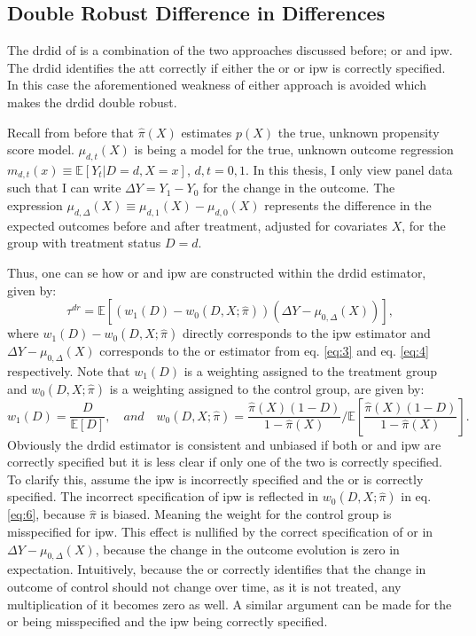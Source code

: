 \subsection{Double Robust Difference in Differences}

The \ac{drdid} of \citet{santannaDoublyRobustDifferenceindifferences2020} is a combination of the two approaches discussed before; \ac{or} and \ac{ipw}.
The \ac{drdid} identifies the \ac{att} correctly if either the \ac{or} or \ac{ipw} is correctly specified.
In this case the aforementioned weakness of either approach is avoided which makes the \ac{drdid} double robust.

Recall from before that $\hat{\pi}(X)$ estimates $p(X)$ the true, unknown propensity score model. $\mu_{d,t}(X)$ is being a model for the true, unknown outcome regression $m_{d,t}(x)\equiv \mathbb{E}[Y_t | D = d, X = x]$, $d, t = 0, 1$.
In this thesis, I only view panel data such that I can write $\Delta Y = Y_1 - Y_0$ for the change in the outcome.
The expression $\mu_{d,\Delta}(X) \equiv \mu_{d,1}(X) - \mu_{d,0}(X)$ represents the difference in the expected outcomes before and after treatment, adjusted for covariates $X$, for the group with treatment status $D=d$.

Thus, one can se how \ac{or} and \ac{ipw} are constructed within the \ac{drdid} estimator, given by:
\begin{equation}
\tau^{dr} = \mathbb{E} \left[ \left( w_1(D) - w_0(D, X; \hat{\pi}) \right) \left( \Delta Y - \mu_{0, \Delta}(X) \right) \right],
\label{eq:5}
\end{equation}
where $w_1(D) - w_0(D, X; \hat{\pi})$ directly corresponds to the \ac{ipw} estimator and $\Delta Y - \mu_{0, \Delta}(X)$ corresponds to the \ac{or} estimator from eq. \ref{eq:3} and eq. \ref{eq:4} respectively.
Note that $w_1(D)$ is a weighting assigned to the treatment group and $w_0(D, X; \hat{\pi})$ is a weighting assigned to the control group, are given by:
\begin{equation}
w_1(D) = \frac{D}{\mathbb{E}[D]}, \quad  \mathit{and} \quad
w_0(D, X; \hat{\pi}) = \frac{\hat{\pi}(X)(1-D)}{1 - \hat{\pi}(X)} \Bigg/ \mathbb{E} \left[ \frac{\hat{\pi}(X)(1-D)}{1 - \hat{\pi}(X)} \right].
\label{eq:6}
\end{equation}
Obviously the \ac{drdid} estimator is consistent and unbiased if both \ac{or} and \ac{ipw} are correctly specified but it is less clear if only one of the two is correctly specified.
To clarify this, assume the \ac{ipw} is incorrectly specified and the \ac{or} is correctly specified.
The incorrect specification of \ac{ipw} is reflected in $w_0(D, X; \hat{\pi})$ in eq. \ref{eq:6}, because $\hat{\pi}$ is biased.
Meaning the weight for the control group is misspecified for \ac{ipw}.
This effect is nullified by the correct specification of \ac{or} in $\Delta Y - \mu_{0, \Delta}(X)$, because the change in the outcome evolution is zero in expectation.
Intuitively, because the \ac{or} correctly identifies that the change in outcome of control should not change over time, as it is not treated, any multiplication of it becomes zero as well.
A similar argument can be made for the \ac{or} being misspecified and the \ac{ipw} being correctly specified.
